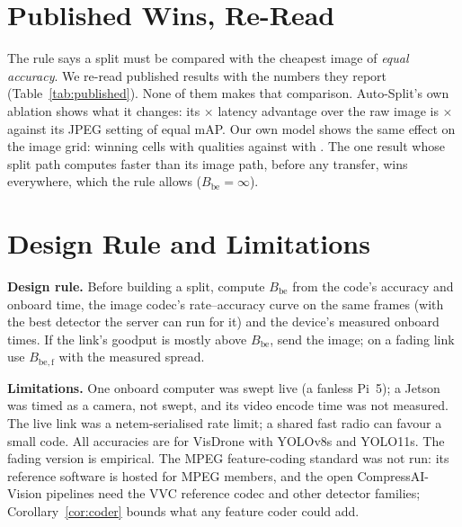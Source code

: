 \documentclass[conference,10pt]{IEEEtran}
\begin{document}
\section{Published Wins, Re-Read}\label{sec:published}
The rule says a split must be compared with the cheapest image of \emph{equal accuracy}. We re-read \BpLitPapers{}
published results with the numbers they report (Table~\ref{tab:published}). None of them makes that comparison.
Auto-Split's own ablation shows what it changes: its \BpLitAutoRaw$\times$ latency advantage over the raw image is
\BpLitAutoMatched$\times$ against its JPEG setting of equal mAP. Our own model shows the same effect on the image grid:
\BeCellsCoarse{} winning cells with \BeJpegQualitiesCoarse{} qualities against \BeCells{} with \BeJpegQualities. The
one result whose split path computes faster than its image path, before any transfer, wins everywhere, which the rule
allows ($B_{\mathrm{be}} = \infty$).
\begin{table}[t]
\centering
\caption{Published split-computing results read against the break-even rule (numbers as each paper reports them).}
\label{tab:published}
\small

\end{table}

\section{Design Rule and Limitations}
\textbf{Design rule.} Before building a split, compute $B_{\mathrm{be}}$ from the code's accuracy and onboard time, the
image codec's rate--accuracy curve on the same frames (with the best detector the server can run for it) and the
device's measured onboard times. If the link's goodput is mostly above $B_{\mathrm{be}}$, send the image; on a fading
link use $B_{\mathrm{be,f}}$ with the measured spread.

\textbf{Limitations.} One onboard computer was swept live (a fanless Pi~5); a Jetson was timed as a camera, not swept,
and its video encode time was not measured. The live link was a netem-serialised rate limit; a shared fast radio can
favour a small code. All accuracies are for VisDrone with YOLOv8s and YOLO11s. The fading version is empirical. The MPEG
feature-coding standard was not run: its reference software is hosted for MPEG members, and the open CompressAI-Vision
pipelines need the VVC reference codec and other detector families; Corollary~\ref{cor:coder} bounds what any feature
coder could add.
\end{document}
